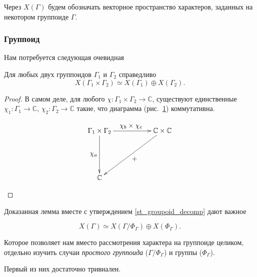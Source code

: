     Через $X(\Gamma)$ будем обозначать векторное пространство характеров, 
    заданных на некотором группоиде $\Gamma$.
\subsubsection{Группоид}
    Нам потребуется следующая очевидная

    \begin{lemma}\label{lm_char_decomp}
        Для любых двух группоидов $\Gamma_1$ и $\Gamma_2$ справедливо
        \[X(\Gamma_1 \times \Gamma_2) \simeq X(\Gamma_1) \oplus X(\Gamma_2).\]
    \end{lemma}
    \begin{proof}
        В самом деле, для любого $\chi : \Gamma_1 
        \times \Gamma_2 \to \mathbb{C}$, существуют единственные
        $\chi_1 : \Gamma_1 \to \mathbb{C}$, $\chi_2 : \Gamma_2 \to \mathbb{C}$ 
        такие, что диаграмма (рис.~\ref{cd_char_sum}) коммутативна.

        \begin{figure}[h]
            \centering
            \[\xymatrix{
                \Gamma_1 \times \Gamma_2 \ar[rr]^{\textstyle \chi_b \times \chi_c} \ar[dd]_{\textstyle \chi_a}  & & \mathbb{C} \times \mathbb{C} \ar[lldd]^{\textstyle +}\\
                                                                                                                & &                                                      \\
                \mathbb{C}                                                                                      & &
            }\]
            \caption{}
            \label{cd_char_sum}
        \end{figure}
    \end{proof}

    Доказанная лемма вместе с утверждением \ref{st_groupoid_decomp} 
    дают важное
    \begin{statement}
        \[X(\Gamma) \simeq X(\Gamma/\Phi_\Gamma) \oplus X(\Phi_\Gamma).\]
    \end{statement}

    Которое позволяет нам вместо рассмотрения характера на группоиде целиком,
    отдельно изучить случаи \emph{простого группоида} ($\Gamma/\Phi_\Gamma$) и
    группы ($\Phi_\Gamma$).

    Первый из них достаточно тривиален.

